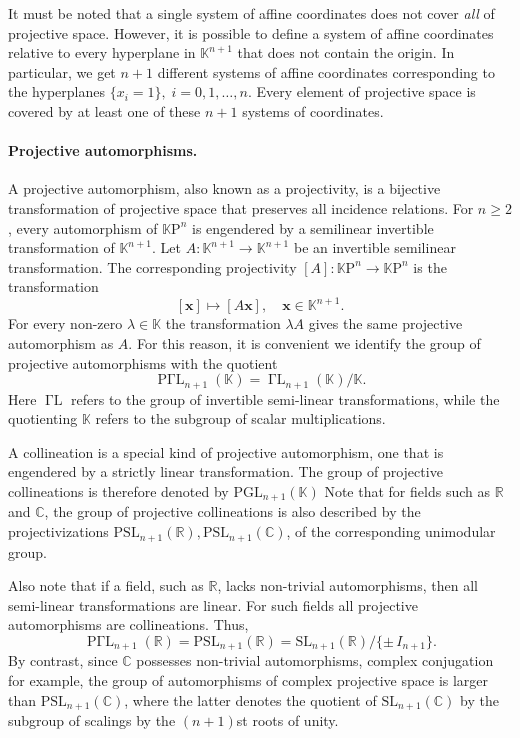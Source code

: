 \documentclass[12pt]{article}
\newcommand{\reals}{\mathbb{R}}
\newcommand{\cnums}{\mathbb{C}}
\newcommand{\kf}{\mathbb{K}}
\newcommand{\KP}{{\mathbb{K}\mathrm{P}}}
\newcommand{\bx}{\mathbf{x}}
\newcommand{\PSL}{{\mathrm{PSL}}}
\newcommand{\SL}{{\mathrm{SL}}}
\newcommand{\PGL}{{\mathrm{PGL}}}
\newcommand{\GammaL}{\operatorname{\Gamma L}}
\newcommand{\PGammaL}{{\operatorname{P\Gamma L}}}
\begin{document}
It must be noted that a single system of affine coordinates does not
cover {\em all} of projective space.  However, it is possible to
define a system of affine coordinates relative to every hyperplane in
$\kf^{n+1}$ that does not contain the origin.  In particular, we get
$n+1$ different systems of affine coordinates corresponding to the
hyperplanes $\{ x_i = 1\},\; i=0,1,\ldots,n.$ Every element of
projective space is covered by at least one of these $n+1$ systems of
coordinates.

\paragraph{Projective automorphisms.}
A projective automorphism, also known as a projectivity, is a
bijective transformation of projective space that preserves all
incidence relations.  For $n\geq 2$, every automorphism of $\KP^n$ is
engendered by a semilinear invertible transformation of $\kf^{n+1}$.
Let $A:\kf^{n+1}\rightarrow\kf^{n+1}$ be an invertible semilinear
transformation.  The corresponding projectivity
$[A]:\KP^n\rightarrow\KP^n$ is the transformation $$[\bx] \mapsto
[A\bx],\quad \bx\in\kf^{n+1}.$$
For every non-zero $\lambda\in\kf$ the
transformation $\lambda A$ gives the same projective automorphism as
$A$.  For this reason, it is convenient we identify the group of
projective automorphisms with the quotient $$\PGammaL_{n+1}(\kf) =
\GammaL_{n+1}(\kf)/ \kf.$$
Here $\GammaL$ refers to the group of
invertible semi-linear transformations, while the quotienting $\kf$
refers to the subgroup of scalar multiplications.

A collineation is a special kind of projective automorphism, one that
is engendered by a strictly linear transformation.  The group of
projective collineations is therefore denoted by $\PGL_{n+1}(\kf)$
Note that for fields such as $\reals$ and $\cnums$, the group of
projective collineations is also described by the projectivizations
$\PSL_{n+1}(\reals), \PSL_{n+1}(\cnums)$, of the corresponding
unimodular group.

Also note that if a field, such as $\reals$, lacks non-trivial
automorphisms, then all semi-linear transformations are linear.  For
such fields all projective automorphisms are collineations.
Thus, 
$$\PGammaL_{n+1}(\reals)=\PSL_{n+1}(\reals)=\SL_{n+1}(\reals)/\{\pm\,
I_{n+1}\}.$$  By contrast, since $\cnums$
possesses non-trivial automorphisms, complex conjugation for example,
the group of automorphisms of complex projective space is larger than
$\PSL_{n+1}(\cnums)$, where the latter denotes the quotient of
$\SL_{n+1}(\cnums)$ by the subgroup of scalings by the $(n+1)$st roots
of unity.
\end{document}
